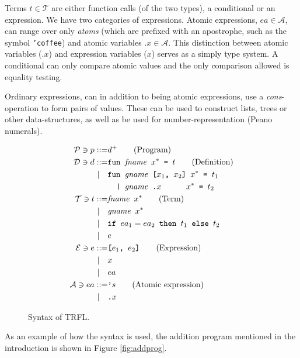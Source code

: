 \documentclass[10pt]{../sigplanconf}
\begin{document}
Terms $t \in \mathcal{T}$ are either function calls (of the two
types), a conditional or an expression. We have two categories of
expressions. Atomic expressions, $ea \in \mathcal{A}$, can range over
only \textit{atoms} (which are prefixed with an apostrophe, such as
the symbol \texttt{'coffee}) and atomic variables $\texttt{.}x \in
\mathcal{A}$. This distinction between atomic variables
($\texttt{.}x$) and expression variables ($x$) serves as a simply type
system. A conditional can only compare atomic values and the only
comparison allowed is equality testing.

Ordinary expressions, can in addition to being atomic expressions, use
a \textit{cons}-operation to form pairs of values. These can be used
to construct lists, trees or other data-structures, as well as be used
for number-representation (Peano numerals).

\begin{figure}\centering
  \begin{align*}
    \mathcal{P} \ni p ::= & d^{+}\tag{Program}\\
    \mathcal{D} \ni d ::= &\texttt{fun \textit{\rmfamily fname} $x^{*}$ = $t$}  \tag{Definition} \\
    | \quad &\texttt{fun \textit{\rmfamily gname} [$x_1$, $x_2$] $x^{*}$ = $t_1$} \\
    & \texttt{\ \ | \textit{\rmfamily gname}\ \texttt{.}$x$ \hspace{.7cm} $x^{*}$ = $t_2$}\\
    \mathcal{T} \ni t ::= & \texttt{\textit{\rmfamily fname} $x^{*}$}  \tag{Term}\\
    | \quad & \texttt{\textit{\rmfamily gname} $x^{*}$} \\
    | \quad & \texttt{if $ea_1 = ea_2$ then $t_1$ else $t_2$} \\
    | \quad & e \\
    \mathcal{E} \ni e ::= & \texttt{[$e_1$, $e_2$]} \tag{Expression}\\
    | \quad & x \\
    | \quad & ea \\
    \mathcal{A} \ni ea ::= & \texttt{'}s \tag{Atomic expression}\\
    | \quad & \texttt{.}x
  \end{align*}
  \caption{Syntax of TRFL.}
\label{fig:bnf}
\end{figure}

As an example of how the syntax is used, the addition program
mentioned in the introduction is shown in Figure \ref{fig:addprog}.
\end{document}
